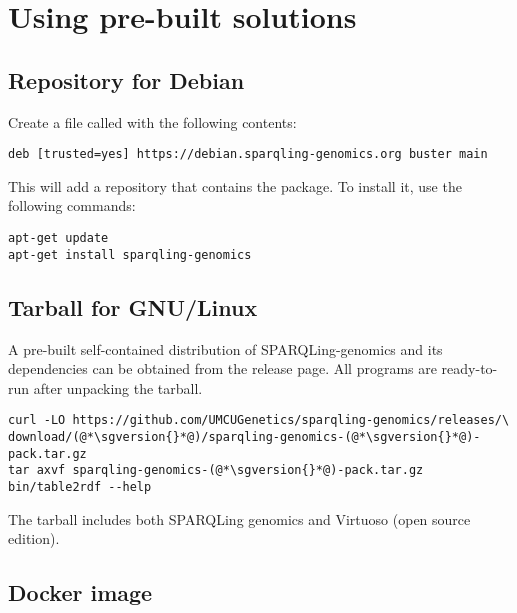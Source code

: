 \section{Using pre-built solutions}

\subsection{Repository for Debian}

Create a file called 
with the following contents:

\begin{siderules}
\begin{verbatim}
deb [trusted=yes] https://debian.sparqling-genomics.org buster main
\end{verbatim}
\end{siderules}

This will add a repository that contains the  package.
To install it, use the following commands:

\begin{siderules}
\begin{verbatim}
apt-get update
apt-get install sparqling-genomics
\end{verbatim}
\end{siderules}

\subsection{Tarball for GNU/Linux}

  A pre-built self-contained distribution of SPARQLing-genomics and
  its dependencies can be obtained from the release page.  All programs
  are ready-to-run after unpacking the tarball.

\begin{siderules}
\begin{lstlisting}
curl -LO https://github.com/UMCUGenetics/sparqling-genomics/releases/\
download/(@*\sgversion{}*@)/sparqling-genomics-(@*\sgversion{}*@)-pack.tar.gz
tar axvf sparqling-genomics-(@*\sgversion{}*@)-pack.tar.gz
bin/table2rdf --help
\end{lstlisting}
\end{siderules}

  The tarball includes both SPARQLing genomics and Virtuoso (open source
  edition).

\subsection{Docker image}

